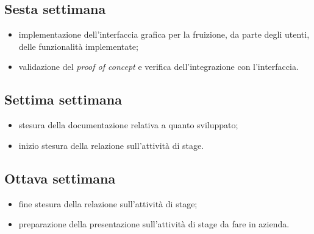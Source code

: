 \subsection*{Sesta settimana} 
\begin{itemize}
	\item implementazione dell'interfaccia grafica per la fruizione, da parte degli utenti, delle funzionalità implementate;
	\item validazione del \textit{proof of concept} e verifica dell'integrazione con l'interfaccia.
\end{itemize}

\subsection*{Settima settimana} 
\begin{itemize}
	\item stesura della documentazione relativa a quanto sviluppato;
	\item inizio stesura della relazione sull'attività di stage.
\end{itemize}

\subsection*{Ottava settimana} 
\begin{itemize}
	\item fine stesura della relazione sull'attività di stage;
	\item preparazione della presentazione sull'attività di stage da fare in azienda.
\end{itemize}


\section{}

